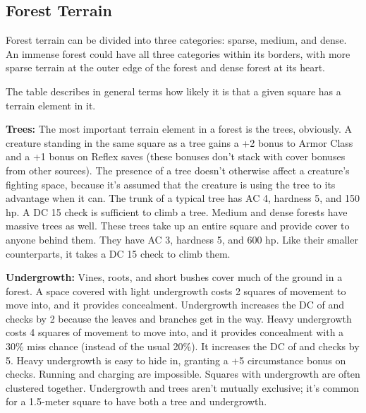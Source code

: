 \subsection{Forest Terrain}
Forest terrain can be divided into three categories: sparse, medium, and dense. An immense forest could have all three categories within its borders, with more sparse terrain at the outer edge of the forest and dense forest at its heart.

The table describes in general terms how likely it is that a given square has a terrain element in it.


\textbf{Trees:} The most important terrain element in a forest is the trees, obviously. A creature standing in the same square as a tree gains a +2 bonus to Armor Class and a +1 bonus on Reflex saves (these bonuses don't stack with cover bonuses from other sources). The presence of a tree doesn't otherwise affect a creature's fighting space, because it's assumed that the creature is using the tree to its advantage when it can. The trunk of a typical tree has AC 4, hardness 5, and 150 hp. A DC 15  check is sufficient to climb a tree. Medium and dense forests have massive trees as well. These trees take up an entire square and provide cover to anyone behind them. They have AC 3, hardness 5, and 600 hp. Like their smaller counterparts, it takes a DC 15  check to climb them.

\textbf{Undergrowth:} Vines, roots, and short bushes cover much of the ground in a forest. A space covered with light undergrowth costs 2 squares of movement to move into, and it provides concealment. Undergrowth increases the DC of  and  checks by 2 because the leaves and branches get in the way. Heavy undergrowth costs 4 squares of movement to move into, and it provides concealment with a 30\% miss chance (instead of the usual 20\%). It increases the DC of  and  checks by 5. Heavy undergrowth is easy to hide in, granting a +5 circumstance bonus on  checks. Running and charging are impossible. Squares with undergrowth are often clustered together. Undergrowth and trees aren't mutually exclusive; it's common for a 1.5-meter square to have both a tree and undergrowth.

